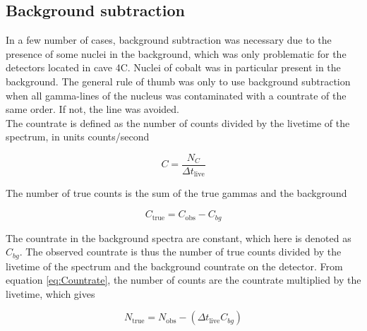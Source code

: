 \subsection{Background subtraction}
In a few number of cases, background subtraction was necessary due to the presence of some nuclei in the background, which was only problematic for the detectors located in cave 4C. Nuclei of cobalt was in particular present in the background. The general rule of thumb was only to use background subtraction when all gamma-lines of the nucleus was contaminated with a countrate of the same order. If not, the line was avoided. \\

\noindent 
The countrate is defined as the number of counts divided by the livetime of the spectrum, in units counts/second 

\begin{equation} \label{eq:Countrate}
    C= \frac{N_C}{\Delta t_\text{live}}
\end{equation}

\noindent The number of true counts is the sum of the true gammas and the background 

\begin{equation}
    C_\text{true} = C_\text{obs} - C_{bg}
\end{equation}

\noindent The countrate in the background spectra are constant, which here is denoted as $C_{bg}$. The observed countrate is thus the number of true counts divided by the livetime of the spectrum and the background countrate on the detector. From equation \ref{eq:Countrate}, the number of counts are the countrate multiplied by the livetime, which gives

\begin{equation}
    N_\text{true} = N_\text{obs}-(\Delta t_\text{live}C_{bg})
\end{equation}


